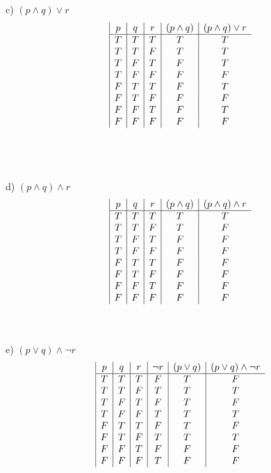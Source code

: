 \documentclass{article}
\begin{document}
\begin{flushleft}
~\\~\\\setlength\parindent{24pt}c) $(p \land q) \lor r$ \\ 
\begin{displaymath}
\begin{array}{| c | c | c | c | c}
$$p$$
& $$q$$
& $$r$$
& $$(p \land q)$$
& $$(p \land q) \lor r$$ \\ \hline
T & T & T & T & T \\ 
T & T & F & T & T \\
T & F & T & F & T \\
T & F & F & F & F \\
F & T & T & F & T \\ 
F & T & F & F & F \\
F & F & T & F & T \\
F & F & F & F & F \\
\end{array}
\end{displaymath}

~\\~\\~\\\setlength\parindent{24pt}d) $(p \land q) \land r$ \\ 
\begin{displaymath}
\begin{array}{| c | c | c | c | c}
$$p$$
& $$q$$
& $$r$$
& $$(p \land q)$$
& $$(p \land q) \land r$$ \\ \hline
T & T & T & T & T \\ 
T & T & F & T & F \\
T & F & T & F & F \\
T & F & F & F & F \\
F & T & T & F & F \\ 
F & T & F & F & F \\
F & F & T & F & F \\
F & F & F & F & F \\
\end{array}
\end{displaymath}

~\\~\\\setlength\parindent{24pt}e) $(p \lor q) \land \neg r$ \\ 
\begin{displaymath}
\begin{array}{| c | c | c | c | c | c}
$$p$$
& $$q$$
& $$r$$
& $$\neg r$$
& $$(p \lor q)$$
& $$(p \lor q) \land \neg r$$ \\ \hline
T & T & T & F & T & F \\ 
T & T & F & T & T & T \\
T & F & T & F & T & F \\
T & F & F & T & T & T \\
F & T & T & F & T & F \\ 
F & T & F & T & T & T \\
F & F & T & F & F & F \\
F & F & F & T & F & F \\
\end{array}
\end{displaymath}


\end{flushleft}
\end{document}
